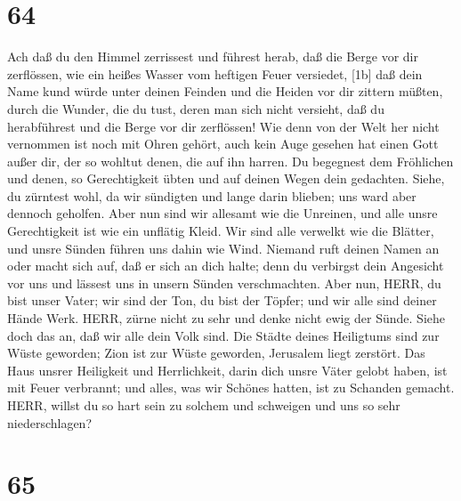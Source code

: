 \hypertarget{section-63}{%
\section{64}\label{section-63}}

 Ach daß du den Himmel zerrissest und führest herab, daß die
Berge vor dir zerflössen, wie ein heißes Wasser vom heftigen Feuer
versiedet,  {[}1b{]} daß dein Name kund würde unter deinen
Feinden und die Heiden vor dir zittern müßten,  durch die
Wunder, die du tust, deren man sich nicht versieht, daß du herabführest
und die Berge vor dir zerflössen!  Wie denn von der Welt her
nicht vernommen ist noch mit Ohren gehört, auch kein Auge gesehen hat
einen Gott außer dir, der so wohltut denen, die auf ihn harren.
 Du begegnest dem Fröhlichen und denen, so Gerechtigkeit
übten und auf deinen Wegen dein gedachten. Siehe, du zürntest wohl, da
wir sündigten und lange darin blieben; uns ward aber dennoch geholfen.
 Aber nun sind wir allesamt wie die Unreinen, und alle unsre
Gerechtigkeit ist wie ein unflätig Kleid. Wir sind alle verwelkt wie die
Blätter, und unsre Sünden führen uns dahin wie Wind. 
Niemand ruft deinen Namen an oder macht sich auf, daß er sich an dich
halte; denn du verbirgst dein Angesicht vor uns und lässest uns in
unsern Sünden verschmachten.  Aber nun, HERR, du bist unser
Vater; wir sind der Ton, du bist der Töpfer; und wir alle sind deiner
Hände Werk.  HERR, zürne nicht zu sehr und denke nicht ewig
der Sünde. Siehe doch das an, daß wir alle dein Volk sind. 
Die Städte deines Heiligtums sind zur Wüste geworden; Zion ist zur Wüste
geworden, Jerusalem liegt zerstört.  Das Haus unsrer
Heiligkeit und Herrlichkeit, darin dich unsre Väter gelobt haben, ist
mit Feuer verbrannt; und alles, was wir Schönes hatten, ist zu Schanden
gemacht.  HERR, willst du so hart sein zu solchem und
schweigen und uns so sehr niederschlagen?

\hypertarget{section-64}{%
\section{65}\label{section-64}}

